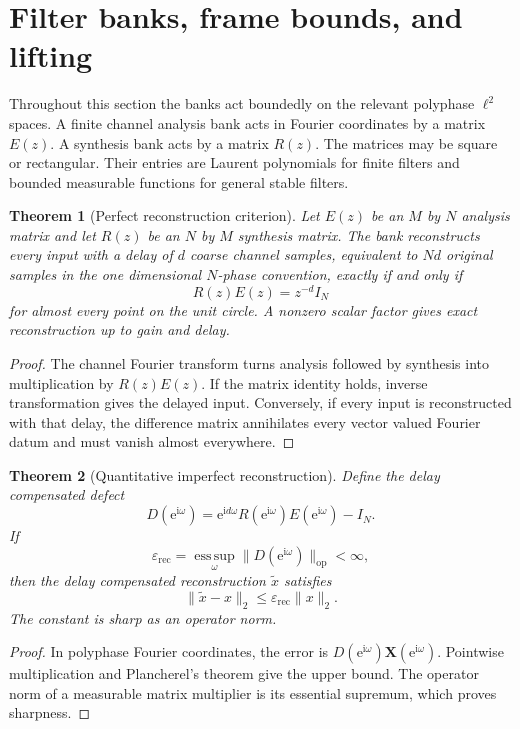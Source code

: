 \documentclass[11pt,a4paper]{article}
\newtheorem{theorem}{Theorem}[section]
\theoremstyle{definition}
\theoremstyle{remark}
\newcommand{\ii}{\mathrm i}
\newcommand{\esssup}{\operatorname*{ess\,sup}}
\newcommand{\e}{\mathrm e}
\begin{document}
\section{Filter banks, frame bounds, and lifting}\label{extension:section:05}\label{sec:filter_banks}

Throughout this section the banks act boundedly on the relevant polyphase \(\ell^2\) spaces. A finite channel analysis bank acts in Fourier coordinates by a matrix \(E(z)\). A synthesis bank acts by a matrix \(R(z)\). The matrices may be square or rectangular. Their entries are Laurent polynomials for finite filters and bounded measurable functions for general stable filters.

\begin{theorem}[Perfect reconstruction criterion]\label{thm:perfect_reconstruction}
Let \(E(z)\) be an \(M\) by \(N\) analysis matrix and let \(R(z)\) be an \(N\) by \(M\) synthesis matrix. The bank reconstructs every input with a delay of \(d\) coarse channel samples, equivalent to \(Nd\) original samples in the one dimensional \(N\)-phase convention, exactly if and only if
\[
R(z)E(z)=z^{-d}I_N
\]
for almost every point on the unit circle. A nonzero scalar factor gives exact reconstruction up to gain and delay.
\end{theorem}

\begin{proof}
The channel Fourier transform turns analysis followed by synthesis into multiplication by \(R(z)E(z)\). If the matrix identity holds, inverse transformation gives the delayed input. Conversely, if every input is reconstructed with that delay, the difference matrix annihilates every vector valued Fourier datum and must vanish almost everywhere.
\end{proof}

\begin{theorem}[Quantitative imperfect reconstruction]\label{thm:imperfect_reconstruction}
Define the delay compensated defect
\[
D(\e^{\ii\omega})
=
\e^{\ii d\omega}R(\e^{\ii\omega})E(\e^{\ii\omega})-I_N.
\]
If
\[
\varepsilon_{\mathrm{rec}}
=
\esssup_{\omega}\|D(\e^{\ii\omega})\|_{\mathrm{op}}<\infty,
\]
then the delay compensated reconstruction \(\widetilde x\) satisfies
\[
\|\widetilde x-x\|_2
\leq
\varepsilon_{\mathrm{rec}}\|x\|_2.
\]
The constant is sharp as an operator norm.
\end{theorem}

\begin{proof}
In polyphase Fourier coordinates, the error is \(D(\e^{\ii\omega})\bm X(\e^{\ii\omega})\). Pointwise multiplication and Plancherel's theorem give the upper bound. The operator norm of a measurable matrix multiplier is its essential supremum, which proves sharpness.
\end{proof}
\end{document}
